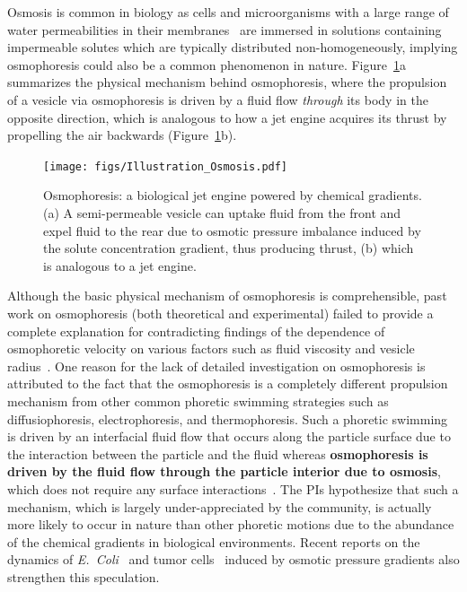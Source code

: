\documentclass[11pt]{article}
\begin{document}
Osmosis is common in biology as cells and microorganisms with a large
range of water permeabilities in their membranes~\cite{deamer1986,
finkelstein1976, lawaczeck1979} are immersed in solutions containing
impermeable solutes which are typically distributed non-homogeneously,
implying osmophoresis could also be a common phenomenon in nature.
Figure~\ref{fig:illustration}a summarizes the physical mechanism behind
osmophoresis, where the propulsion of a vesicle via osmophoresis is
driven by a fluid flow {\em through} its body in the opposite direction,
which is analogous to how a jet engine acquires its thrust by propelling
the air backwards (Figure~\ref{fig:illustration}b). 
\begin{figure}[h]
\begin{center}
\texttt{[image: figs/Illustration\_Osmosis.pdf]}
\caption{Osmophoresis: a biological jet engine powered by chemical
  gradients. (a) A semi-permeable vesicle can uptake fluid from the
  front and expel fluid to the rear due to osmotic pressure imbalance
  induced by the solute concentration gradient, thus producing thrust,
  (b) which is analogous to a jet engine.}
\label{fig:illustration}
\end{center}
\end{figure}

Although the basic physical mechanism of osmophoresis is comprehensible,
past work on osmophoresis (both theoretical and experimental) failed to
provide a complete explanation for contradicting findings of the
dependence of osmophoretic velocity on various factors such as fluid
viscosity and vesicle radius~\cite{anderson1983, anderson1986,
gordon1981, nardi1999}.   One reason for the lack of
detailed investigation on osmophoresis is attributed to the fact that
the osmophoresis is a completely different propulsion mechanism from
other common phoretic swimming strategies such as diffusiophoresis,
electrophoresis, and thermophoresis. Such a phoretic swimming is driven
by an interfacial fluid flow that occurs along the particle surface due
to the interaction between the particle and the fluid whereas {\bf
osmophoresis is driven by the fluid flow through the particle interior
due to osmosis}, which does not require any surface
interactions~\cite{anderson1986,anderson1989}. The PIs hypothesize that
such a mechanism, which is largely under-appreciated by the community,
is actually more likely to occur in nature than other phoretic motions
due to the abundance of the chemical gradients in biological
environments.  Recent reports on the dynamics of {\em
E.~Coli}~\cite{rosko2017} and tumor cells~\cite{stroka2014} induced by
osmotic pressure gradients also strengthen this speculation. 
\end{document}
